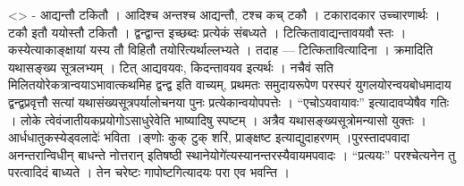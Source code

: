 \textless{}\textgreater{} - आद्यन्तौ टकितौ । आदिश्च अन्तश्च आद्यन्तौ,
टश्च कच् टकौ । टकारादकार उच्चारणार्थः । टकौ इतौ ययोस्तौ टकितौ ।
द्वन्द्वान्त इच्छब्दः प्रत्येकं संबध्यते । टित्कितावाद्यन्तावयवौ स्तः ।
कस्येत्याकाङ्क्षायां यस्य तौ विहितौ तयोरित्यर्थाल्लभ्यते । तदाह ---
टित्कितावित्यादिना । क्रमादिति यथासङ्ख्य सूत्रलभ्यम् । टित् आद्यवयवः,
किदन्तावयव इत्यर्थः । नचैवं सति मिलितयोरेकत्रान्वयाऽभावात्कथमिह द्वन्द्व
इति वाच्यम्, प्रथमतः समुदायरूपेण परस्परं युगलयोरन्वयबोधमादाय
द्वन्द्वप्रवृत्तौ सत्यां यथासंख्यसूत्रपर्यालोचनया पुनः
प्रत्येकान्वयोपपत्तेः । ``एचोऽयवायावः'' इत्यादावप्येषैव गतिः । लोके
त्वेवंजातीयकप्रयोगोऽसाधुरेवेति भाष्यादिषु स्पष्टम् । अत्रैव
यथासङ्ख्यसूत्रोमन्यासो युक्तः ।आर्धधातुकस्येड्वलादेः॑ भविता ।ङ्णोः कुक्
टुक् शरि॑, प्राङ्क्षष्ट इत्याद्युदाहरणम् ।पुरस्तादपवादा अनन्तरान्विधीन्
बाधन्ते नोत्तरान् इतिषष्ठी स्थानेयोगे॑त्यस्यानन्तरस्यैवायमपवादः ।
``प्रत्ययः'' परश्चेत्यनेन तु परत्वादिदं बाध्यते । तेन चरेष्टः
गापोष्टगित्यादयः परा एव भवन्ति ।
